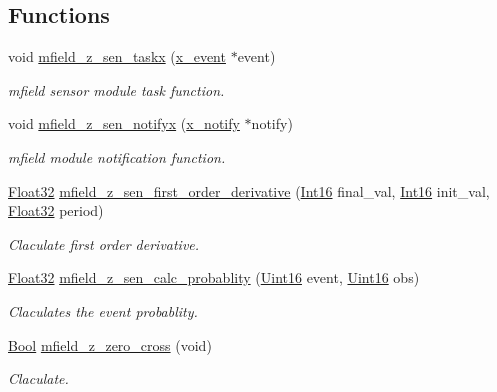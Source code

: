 \subsection*{Functions}
\begin{DoxyCompactItemize}
\item 
void \hyperlink{a00053_a7ef08302978421a5dc004f06aab80a8a}{mfield\+\_\+z\+\_\+sen\+\_\+taskx} (\hyperlink{a00036_de/d37/a00849}{x\+\_\+event} $\ast$event)
\begin{DoxyCompactList}\small\item\em mfield sensor module task function. \end{DoxyCompactList}\item 
void \hyperlink{a00053_a2008fa1563c740e4f6c7e1179675f1f7}{mfield\+\_\+z\+\_\+sen\+\_\+notifyx} (\hyperlink{a00036_df/d4c/a00851}{x\+\_\+notify} $\ast$notify)
\begin{DoxyCompactList}\small\item\em mfield module notification function. \end{DoxyCompactList}\item 
\hyperlink{a00072_a87d38f886e617ced2698fc55afa07637}{Float32} \hyperlink{a00053_a82939d05c14b8ab80cacc21b7a1b8d3e}{mfield\+\_\+z\+\_\+sen\+\_\+first\+\_\+order\+\_\+derivative} (\hyperlink{a00072_a659ce9e5eb6571f9984ffc7caad2660a}{Int16} final\+\_\+val, \hyperlink{a00072_a659ce9e5eb6571f9984ffc7caad2660a}{Int16} init\+\_\+val, \hyperlink{a00072_a87d38f886e617ced2698fc55afa07637}{Float32} period)
\begin{DoxyCompactList}\small\item\em Claculate first order derivative. \end{DoxyCompactList}\item 
\hyperlink{a00072_a87d38f886e617ced2698fc55afa07637}{Float32} \hyperlink{a00053_a8a5c3986dbe778d199b6e3b485f7a34b}{mfield\+\_\+z\+\_\+sen\+\_\+calc\+\_\+probablity} (\hyperlink{a00072_a59a9f6be4562c327cbfb4f7e8e18f08b}{Uint16} event, \hyperlink{a00072_a59a9f6be4562c327cbfb4f7e8e18f08b}{Uint16} obs)
\begin{DoxyCompactList}\small\item\em Claculates the event probablity. \end{DoxyCompactList}\item 
\hyperlink{a00072_a253b248072cfc8bd812c69acd0046eed}{Bool} \hyperlink{a00053_a8830f50d7a451bec0a7d61c44d5cd98b}{mfield\+\_\+z\+\_\+zero\+\_\+cross} (void)
\begin{DoxyCompactList}\small\item\em Claculate. \end{DoxyCompactList}\item 

\end{DoxyCompactItemize}
